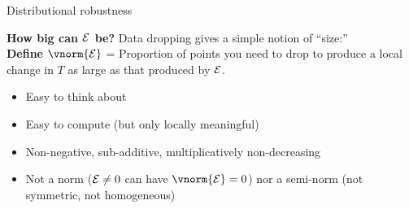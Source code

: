 \begin{frame}[t]{Distributional robustness}

\textbf{How big can $\mathcal{E}$ be?}
Data dropping gives a simple notion of ``size:''\\[1em]

\textbf{Define} $\vnorm{\shift}$ = Proportion of points you need to drop to
produce a local change in $T$ as large as that produced by $\mathcal{E}$. 

\pause

{
\begin{center}
\begin{minipage}{0.8\textwidth}
\SimRefitOne{}
\end{minipage}
\end{center}
}


\pause

\begin{itemize}
    \item Easy to think about
    \item Easy to compute (but only locally meaningful)
    \item Non-negative, sub-additive, multiplicatively non-decreasing
    \item Not a norm ($\mathcal{E} \ne 0$ can have $\vnorm{\shift} = 0$) nor a
    semi-norm (not symmetric, not homogeneous)
\end{itemize}

\end{frame}

